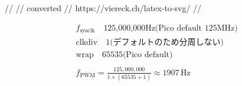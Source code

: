 //
// converted 
// https://viereck.ch/latex-to-svg/
//

\begin{align*}
& f_{\mathrm{sysclk}} \quad \text{125,000,000Hz(Pico default 125MHz)} \\
& \mathrm{clkdiv}  \quad \text{1(デフォルトのため分周しない)} \\
& \mathrm{wrap}    \quad \text{65535(Pico default)} \\
\\
& f_{\mathrm{PWM}}  = \frac{125,000,000}{1 \times (65535 + 1)} \approx 1907 \, \text{Hz}
\end{align*}